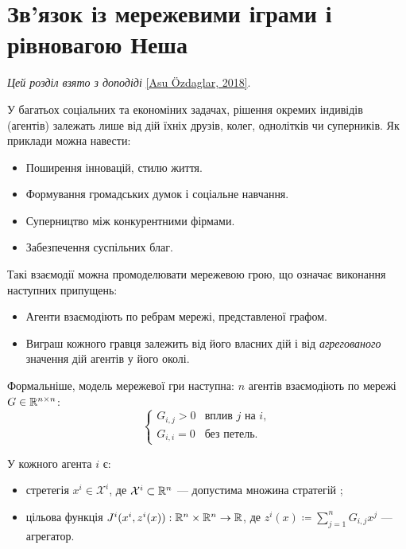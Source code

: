 \section{Зв'язок із мережевими іграми і рівновагою Неша}

\emph{Цей розділ взято з доподіді} \href{https://simons.berkeley.edu/talks/asu-ozdaglar-3-28-18}{[Asu \"Ozdaglar, 2018]}. \medskip

У багатьох соціальних та економіних задачах, рішення окремих індивідів (агентів) залежать лише від дій їхніх друзів, колег, однолітків чи суперників. Як приклади можна навести:
\begin{itemize}
    \item Поширення інновацій, стилю життя.
    \item Формування громадських думок і соціальне навчання.
    \item Суперництво між конкурентними фірмами.
    \item Забезпечення суспільних благ.
\end{itemize}

Такі взаємодії можна промоделювати мережевою грою, що означає виконання наступних припущень:
\begin{itemize}
    \item Агенти взаємодіють по ребрам мережі, представленої графом.
    \item Виграш кожного гравця залежить від його власних дій і від \emph{агрегованого} значення дій агентів у його околі.
\end{itemize}

Формальніше, модель мережевої гри наступна: $n$ агентів взаємодіють по мережі $G \in \mathbb{R}^{n \times n}$:
\begin{equation}
    \begin{cases}
        G_{i,j} > 0 & \text{вплив }j\text{ на }i, \\
        G_{i,i} = 0 & \text{без петель}.
    \end{cases}
\end{equation}

У кожного агента $i$ є:
\begin{itemize}
    \item стретегія $x^i \in \mathcal{X}^i$, де $\mathcal{X}^i \subset \mathbb{R}^n$ --- допустима множина стратегій ;
    \item цільова функція $J^i(x^i, z^i(x)): \mathbb{R}^n \times \mathbb{R}^n \to \mathbb{R}$, де $z^i(x) \coloneqq \sum_{j = 1}^n G_{i,j} x^j$ --- агрегатор.
\end{itemize}

